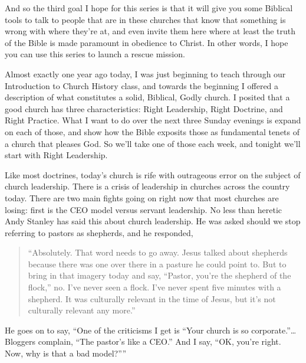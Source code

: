 \documentclass[letterpaper, 12pt]{article}
\begin{document}
    And so the third goal I hope for this series is that it will give
    you some Biblical tools to talk to people that are in these churches
    that know that something is wrong with where they're at, and even
    invite them here where at least the truth of the Bible is made
    paramount in obedience to Christ. In other words, I hope you can use
    this series to launch a rescue mission.
    
    Almost exactly one year ago today, I was just beginning to teach
    through our Introduction to Church History class, and towards the
    beginning I offered a description of what constitutes a solid,
    Biblical, Godly church. I posited that a good church has three
    characteristics: Right Leadership, Right Doctrine, and Right
    Practice. What I want to do over the next three Sunday evenings is
    expand on each of those, and show how the Bible exposits those as
    fundamental tenets of a church that pleases God. So we'll take one
    of those each week, and tonight we'll start with Right Leadership.

    Like most doctrines, today's church is rife with outrageous error on
    the subject of church leadership. There is a crisis of leadership in
    churches across the country today. There are two main fights going
    on right now that most churches are losing: first is the CEO model
    versus servant leadership. No less than heretic Andy Stanley has
    said this about church leadership. He was asked should we stop
    referring to pastors as shepherds, and he responded, 

    \begin{quote}

            ``Absolutely.  That word needs to go away. Jesus talked
            about shepherds because there was one over there in a
            pasture he could point to. But to bring in that imagery
            today and say, ``Pastor, you’re the shepherd of the flock,''
            no. I've never seen a flock. I've never spent five minutes
            with a shepherd. It was culturally relevant in the time of
            Jesus, but it's not culturally relevant any more.'' 

    \end{quote}

    He goes on to say, ``One of the criticisms I get is ``Your church is
    so corporate.''\ldots Bloggers complain, ``The pastor's like a
    CEO.'' And I say, ``OK, you’re right.  Now, why is that a bad
    model?''''
\end{document}
